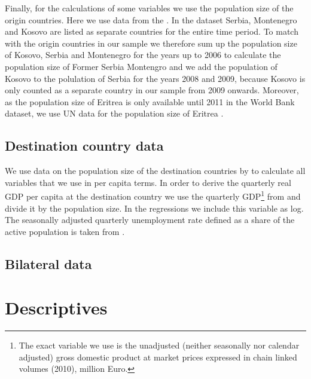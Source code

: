 \documentclass[11pt,a4paper]{scrartcl}
\begin{document}
Finally, for the calculations of some variables we use the population size of the origin countries. Here we use data from the \textcite{Worldbank2017b}. In the dataset Serbia, Montenegro and Kosovo are listed as separate countries for the entire time period. To match with the origin countries in our sample we therefore sum up the population size of Kosovo, Serbia and Montenegro for the years up to 2006 to calculate the population size of Former Serbia Montengro and we add the population of Kosovo to the polulation of Serbia for the years 2008 and 2009, because Kosovo is only counted as a separate country in our sample from 2009 onwards. Moreover, as the population size of Eritrea is only available until 2011 in the World Bank dataset, we use UN data for the population size of Eritrea \parencite{UN2017}.  

\subsection{Destination country data}
We use data on the population size of the destination countries by \textcite{Eurostat2017e} to calculate all variables that we use in per capita terms.    
In order to derive the quarterly real GDP per capita at the destination country we use the quarterly GDP\footnote{The exact variable we use is the unadjusted (neither seasonally nor calendar adjusted) gross domestic product at market prices expressed in chain linked volumes (2010), million Euro.} from \textcite{Eurostat2017f} and divide it by the population size. In the regressions we include this variable as log. 
The seasonally adjusted quarterly unemployment rate defined as a share of the active population is taken from \textcite{Eurostat2018d}. 


\subsection{Bilateral data}



\clearpage
\FloatBarrier
\section{Descriptives}


 
\end{document}
